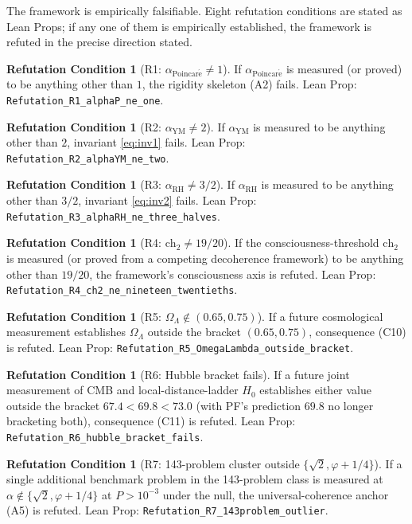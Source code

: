 \documentclass[11pt,a4paper]{article}
\theoremstyle{definition}
\newtheorem{refutation}[theorem]{Refutation Condition}
\theoremstyle{remark}
\newcommand{\chtwo}{\mathrm{ch}_{2}}
\newcommand{\alphaRH}{\alpha_{\mathrm{RH}}}
\newcommand{\alphaYM}{\alpha_{\mathrm{YM}}}
\newcommand{\alphaP}{\alpha_{\mathrm{Poincar\acute{e}}}}
\newcommand{\lean}[1]{\texttt{\small #1}}
\begin{document}
The framework is empirically falsifiable. Eight refutation
conditions are stated as Lean Props; if any one of them is
empirically established, the framework is refuted in the precise
direction stated.

\begin{refutation}[R1: $\alphaP \ne 1$]
If $\alphaP$ is measured (or proved) to be anything other than
$1$, the rigidity skeleton (A2) fails. Lean Prop:
\lean{Refutation\_R1\_alphaP\_ne\_one}.
\end{refutation}

\begin{refutation}[R2: $\alphaYM \ne 2$]
If $\alphaYM$ is measured to be anything other than $2$, invariant
\eqref{eq:inv1} fails. Lean Prop:
\lean{Refutation\_R2\_alphaYM\_ne\_two}.
\end{refutation}

\begin{refutation}[R3: $\alphaRH \ne 3/2$]
If $\alphaRH$ is measured to be anything other than $3/2$,
invariant \eqref{eq:inv2} fails. Lean Prop:
\lean{Refutation\_R3\_alphaRH\_ne\_three\_halves}.
\end{refutation}

\begin{refutation}[R4: $\chtwo \ne 19/20$]
If the consciousness-threshold $\chtwo$ is measured (or proved
from a competing decoherence framework) to be anything other than
$19/20$, the framework's consciousness axis is refuted. Lean
Prop: \lean{Refutation\_R4\_ch2\_ne\_nineteen\_twentieths}.
\end{refutation}

\begin{refutation}[R5: $\Omega_{\Lambda} \notin (0.65, 0.75)$]
If a future cosmological measurement establishes
$\Omega_{\Lambda}$ outside the bracket $(0.65, 0.75)$, consequence
(C10) is refuted. Lean Prop:
\lean{Refutation\_R5\_OmegaLambda\_outside\_bracket}.
\end{refutation}

\begin{refutation}[R6: Hubble bracket fails]
If a future joint measurement of CMB and local-distance-ladder
$H_{0}$ establishes either value outside the bracket
$67.4 < 69.8 < 73.0$ (with PF's prediction $69.8$ no longer
bracketing both), consequence (C11) is refuted. Lean Prop:
\lean{Refutation\_R6\_hubble\_bracket\_fails}.
\end{refutation}

\begin{refutation}[R7: 143-problem cluster outside $\{\sqrt{2}, \varphi + 1/4\}$]
If a single additional benchmark problem in the 143-problem class
is measured at $\alpha \notin \{\sqrt{2}, \varphi + 1/4\}$ at
$P > 10^{-3}$ under the null, the universal-coherence anchor (A5)
is refuted. Lean Prop:
\lean{Refutation\_R7\_143problem\_outlier}.
\end{refutation}
\end{document}
